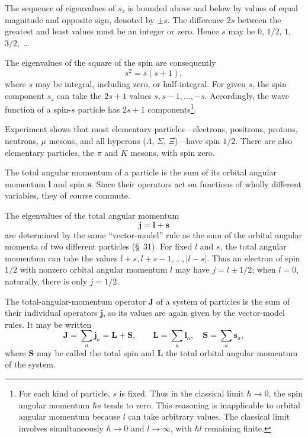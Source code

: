 The sequence of eigenvalues of $s_z$ is bounded above and below by values of
equal magnitude and opposite sign, denoted by $\pm s$. The difference $2s$
between the greatest and least values must be an integer or zero. Hence $s$
may be $0$, $1/2$, $1$, $3/2$,~\dots

The eigenvalues of the square of the spin are consequently
\begin{equation}
 s^2=s(s+1),
 \tag{54.2}
\end{equation}
where $s$ may be integral, including zero, or half-integral. For given $s$,
the spin component $s_z$ can take the $2s+1$ values
$s,s-1,\ldots,-s$. Accordingly, the wave function of a spin-$s$ particle has
$2s+1$ components\footnote{For each kind of particle, $s$ is fixed. Thus in
the classical limit $\hbar\to0$, the spin angular momentum $\hbar s$ tends
to zero. This reasoning is inapplicable to orbital angular momentum because
$l$ can take arbitrary values. The classical limit involves simultaneously
$\hbar\to0$ and $l\to\infty$, with $\hbar l$ remaining finite.}.

Experiment shows that most elementary particles---electrons, positrons,
protons, neutrons, $\mu$ mesons, and all hyperons ($\Lambda$, $\Sigma$,
$\Xi$)---have spin $1/2$. There are also elementary particles, the $\pi$ and
$K$ mesons, with spin zero.

The total angular momentum of a particle is the sum of its orbital angular
momentum $\mathbf l$ and spin $\mathbf s$. Since their operators act on
functions of wholly different variables, they of course commute.

The eigenvalues of the total angular momentum
\begin{equation}
 \mathbf j=\mathbf l+\mathbf s
 \tag{54.3}
\end{equation}
are determined by the same ``vector-model'' rule as the sum of the orbital
angular momenta of two different particles (\S~31). For fixed $l$ and $s$,
the total angular momentum can take the values
$l+s,l+s-1,\ldots,|l-s|$. Thus an electron of spin $1/2$ with nonzero
orbital angular momentum $l$ may have $j=l\pm1/2$; when $l=0$, naturally,
there is only $j=1/2$.

The total-angular-momentum operator $\mathbf J$ of a system of particles is
the sum of their individual operators $\mathbf j$, so its values are again
given by the vector-model rules. It may be written
\begin{equation}
 \mathbf J=\sum_a\mathbf j_a=\mathbf L+\mathbf S,
 \qquad \mathbf L=\sum_a\mathbf l_a,\quad
 \mathbf S=\sum_a\mathbf s_a,
 \tag{54.4}
\end{equation}
where $\mathbf S$ may be called the total spin and $\mathbf L$ the total
orbital angular momentum of the system.

